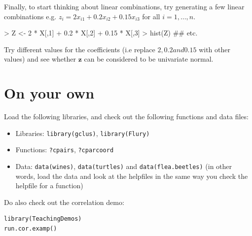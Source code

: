 \documentclass[11pt]{article}
\begin{document}
Finally, to start thinking about linear combinations, try generating a few linear combinations e.g. $z_{i} = 2x_{i1}+0.2x_{i2}+0.15x_{i3}$ for all $i = 1, \ldots, n$.

\begin{Schunk}
\begin{Sinput}
> Z <- 2 * X[,1] + 0.2 * X[,2] + 0.15 * X[,3]
> hist(Z) ## etc.
\end{Sinput}
\end{Schunk}

Try different values for the coefficients (i.e replace $2, 0.2 and 0.15$ with other values) and see whether $\boldsymbol{z}$ can be considered to be univariate normal.


\section{On your own}

Load the following libraries, and check out the following functions and data files:   

\begin{itemize}
\item Libraries: \texttt{library(gclus)}, \texttt{library(Flury)}
\item Functions: \texttt{?cpairs}, \texttt{?cparcoord} 
\item Data: \texttt{data(wines)}, \texttt{data(turtles)} and \texttt{data(flea.beetles)} (in other words, load the data and look at the helpfiles in the same way you check the helpfile for a function)
\end{itemize}



Do also check out the correlation demo:

\begin{verbatim}
library(TeachingDemos)
run.cor.examp()
\end{verbatim}
\end{document}
